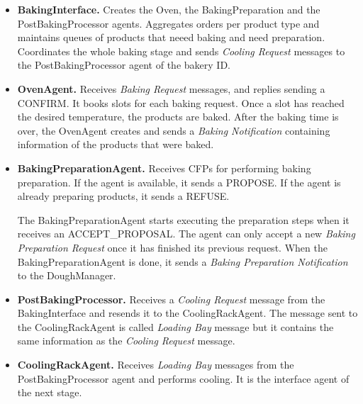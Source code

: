 \documentclass[paper=a4, fontsize=11pt]{scrartcl}
\begin{document}
\begin{itemize}
		\item \textbf{BakingInterface.} Creates the Oven, the BakingPreparation and the PostBakingProcessor agents. Aggregates orders per product type and maintains queues of products that neeed baking and need preparation. Coordinates the whole baking stage and sends \textit{Cooling Request} messages to the PostBakingProcessor agent of the bakery ID. \\
		
		\item \textbf{OvenAgent.} Receives \textit{Baking Request} messages, and replies sending a CONFIRM. It books slots for each baking request. Once a slot has reached the desired temperature, the products are baked. After the baking time is over, the OvenAgent creates and sends a \textit{Baking Notification} containing information of the products that were baked. \\
		
		\item \textbf{BakingPreparationAgent.} Receives CFPs for performing baking preparation. If the agent is available, it sends a PROPOSE. If the agent is already preparing products, it sends a REFUSE. 
		
		The BakingPreparationAgent starts executing the preparation steps when it receives an ACCEPT\_PROPOSAL. The agent can only accept a new \textit{Baking Preparation Request} once it has finished its previous request. When the BakingPreparationAgent is done, it sends a \textit{Baking Preparation Notification} to the DoughManager. \\ 
			
		\item \textbf{PostBakingProcessor.} Receives a \textit{Cooling Request} message from the BakingInterface and resends it to the CoolingRackAgent. The message sent to the CoolingRackAgent is called \textit{Loading Bay} message but it contains the same information as the \textit{Cooling Request} message. \\
		
		\item \textbf{CoolingRackAgent.} Receives \textit{Loading Bay} messages from the PostBakingProcessor agent and performs cooling. It is the interface agent of the next stage.
		
	\end{itemize}
	\newpage
\end{document}
